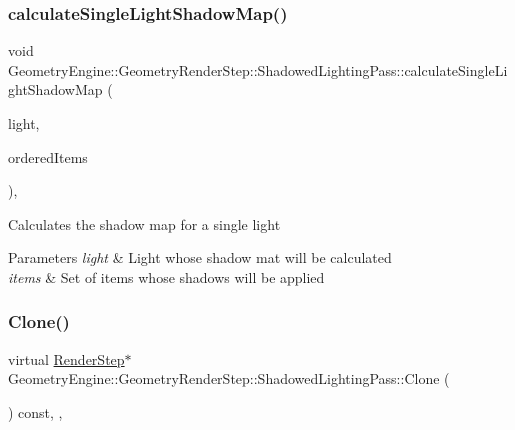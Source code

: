\subsubsection{\texorpdfstring{calculateSingleLightShadowMap()}{calculateSingleLightShadowMap()}}
{\footnotesize\ttfamily void Geometry\+Engine\+::\+Geometry\+Render\+Step\+::\+Shadowed\+Lighting\+Pass\+::calculate\+Single\+Light\+Shadow\+Map (\begin{DoxyParamCaption}\item[{\mbox{\hyperlink{class_geometry_engine_1_1_geometry_world_item_1_1_geometry_light_1_1_light}{Geometry\+World\+Item\+::\+Geometry\+Light\+::\+Light}} $\ast$}]{light,  }\item[{std\+::map$<$ float, \mbox{\hyperlink{class_geometry_engine_1_1_geometry_world_item_1_1_geometry_item_1_1_geometry_item}{Geometry\+World\+Item\+::\+Geometry\+Item\+::\+Geometry\+Item}} $\ast$ $>$ $\ast$}]{ordered\+Items }\end{DoxyParamCaption})\hspace{0.3cm}{\ttfamily [protected]}, {\ttfamily [virtual]}}

Calculates the shadow map for a single light 
\begin{DoxyParams}{Parameters}
{\em light} & Light whose shadow mat will be calculated \\
\hline
{\em items} & Set of items whose shadows will be applied \\
\hline
\end{DoxyParams}
\mbox{\label{class_geometry_engine_1_1_geometry_render_step_1_1_shadowed_lighting_pass_a73176d6860aee0903034eeaf93edb40d}} 
\subsubsection{\texorpdfstring{Clone()}{Clone()}}
{\footnotesize\ttfamily virtual \mbox{\hyperlink{class_geometry_engine_1_1_geometry_render_step_1_1_render_step}{Render\+Step}}$\ast$ Geometry\+Engine\+::\+Geometry\+Render\+Step\+::\+Shadowed\+Lighting\+Pass\+::\+Clone (\begin{DoxyParamCaption}{ }\end{DoxyParamCaption}) const\hspace{0.3cm}{\ttfamily [inline]}, {\ttfamily [override]}, {\ttfamily [virtual]}}

